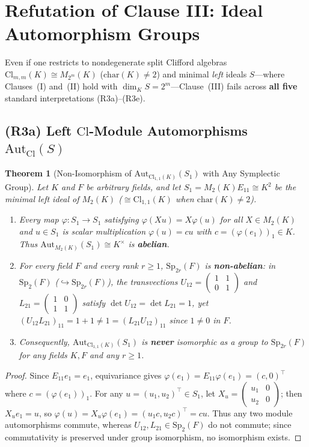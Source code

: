 \documentclass[11pt,a4paper]{article}
\newcommand{\smat}[4]{\left(\begin{smallmatrix}#1&#2\\#3&#4\end{smallmatrix}\right)}
\newtheorem{theorem}{Theorem}[section]
\theoremstyle{definition}
\newcommand{\Cl}{\mathrm{Cl}}
\newcommand{\Aut}{\mathrm{Aut}}
\newcommand{\Sp}{\mathrm{Sp}}
\begin{document}
\section{Refutation of Clause III: Ideal Automorphism Groups}\label{sec:automorphisms}

Even if one restricts to nondegenerate split Clifford algebras $\Cl_{m,m}(K) \cong M_{2^m}(K)$ ($\mathrm{char}(K) \neq 2$) and minimal \emph{left} ideals $S$---where Clauses~(I) and~(II) hold with $\dim_K S = 2^m$---Clause~(III) fails across \textbf{all five} standard interpretations (R3a)--(R3e).

\subsection{(R3a) Left \texorpdfstring{$\Cl$}{Cl}-Module Automorphisms \texorpdfstring{$\Aut_{\Cl}(S)$}{Aut\_Cl(S)}}

\begin{theorem}[Non-Isomorphism of $\Aut_{\Cl_{1,1}(K)}(S_1)$ with Any Symplectic Group]\label{thm:clmod}
Let $K$ and $F$ be arbitrary fields, and let $S_1 = M_2(K)E_{11} \cong K^2$ be the minimal left ideal of $M_2(K)$ ($\cong \Cl_{1,1}(K)$ when $\mathrm{char}(K) \neq 2$).
\begin{enumerate}
  \item[(1)] Every map $\varphi : S_1 \to S_1$ satisfying $\varphi(X u) = X \varphi(u)$ for all $X \in M_2(K)$ and $u \in S_1$ is scalar multiplication $\varphi(u) = c u$ with $c = (\varphi(e_1))_1 \in K$. Thus $\Aut_{M_2(K)}(S_1) \cong K^\times$ is \textbf{abelian}.
  \item[(2)] For every field $F$ and every rank $r \ge 1$, $\Sp_{2r}(F)$ is \textbf{non-abelian}: in $\Sp_2(F)$ ($\hookrightarrow \Sp_{2r}(F)$), the transvections $U_{12} = \smat{1}{1}{0}{1}$ and $L_{21} = \smat{1}{0}{1}{1}$ satisfy $\det U_{12} = \det L_{21} = 1$, yet $(U_{12} L_{21})_{11} = 1 + 1 \neq 1 = (L_{21} U_{12})_{11}$ since $1 \neq 0$ in $F$.
  \item[(3)] Consequently, $\Aut_{\Cl_{1,1}(K)}(S_1)$ is \textbf{never} isomorphic as a group to $\Sp_{2r}(F)$ for any fields $K, F$ and any $r \ge 1$.
\end{enumerate}
\end{theorem}

\begin{proof}
Since $E_{11} e_1 = e_1$, equivariance gives $\varphi(e_1) = E_{11}\varphi(e_1) = (c, 0)^\top$ where $c = (\varphi(e_1))_1$. For any $u = (u_1, u_2)^\top \in S_1$, let $X_u = \smat{u_1}{0}{u_2}{0}$; then $X_u e_1 = u$, so $\varphi(u) = X_u \varphi(e_1) = (u_1 c, u_2 c)^\top = c u$. Thus any two module automorphisms commute, whereas $U_{12}, L_{21} \in \Sp_2(F)$ do not commute; since commutativity is preserved under group isomorphism, no isomorphism exists.
\end{proof}
\end{document}
